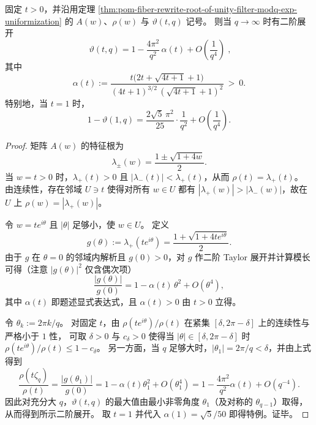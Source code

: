 \begin{theorem}\label{thm:pom-root-unity-filter-vartheta-second-order}
固定 \(t>0\)，并沿用定理 \ref{thm:pom-fiber-rewrite-root-of-unity-filter-modq-exp-uniformization} 的 \(A(w)\)、\(\rho(w)\) 与 \(\vartheta(t,q)\) 记号。
则当 \(q\to\infty\) 时有二阶展开
\[
\boxed{\;
\vartheta(t,q)
=1-\frac{4\pi^2}{q^2}\,\alpha(t)+O\!\left(\frac{1}{q^4}\right)\;},
\]
其中
\[
\alpha(t)
:=\frac{t\bigl(2t+\sqrt{4t+1}+1\bigr)}{(4t+1)^{3/2}\,(\sqrt{4t+1}+1)^2}\ >\ 0.
\]
特别地，当 \(t=1\) 时，
\[
1-\vartheta(1,q)=\frac{2\sqrt5\,\pi^2}{25}\cdot\frac{1}{q^2}+O\!\left(\frac{1}{q^4}\right).
\]
\end{theorem}
\begin{proof}
矩阵 \(A(w)\) 的特征根为
\[
\lambda_\pm(w)=\frac{1\pm\sqrt{1+4w}}{2}.
\]
当 \(w=t>0\) 时，\(\lambda_+(t)>0\) 且 \(|\lambda_-(t)|<\lambda_+(t)\)，从而 \(\rho(t)=\lambda_+(t)\)。
由连续性，存在邻域 \(U\ni t\) 使得对所有 \(w\in U\) 都有 \(|\lambda_+(w)|>|\lambda_-(w)|\)，故在 \(U\) 上
\(
\rho(w)=|\lambda_+(w)|
\)。
\par
令 \(w=t e^{i\theta}\) 且 \(|\theta|\) 足够小，使 \(w\in U\)。
定义
\[
g(\theta):=\lambda_+(t e^{i\theta})=\frac{1+\sqrt{1+4t e^{i\theta}}}{2}.
\]
由于 \(g\) 在 \(\theta=0\) 的邻域内解析且 \(g(0)>0\)，对 \(g\) 作二阶 Taylor 展开并计算模长可得（注意 \(|g(\theta)|^2\) 仅含偶次项）
\[
\frac{|g(\theta)|}{g(0)}=1-\alpha(t)\,\theta^2+O(\theta^4),
\]
其中 \(\alpha(t)\) 即题述显式表达式，且 \(\alpha(t)>0\) 由 \(t>0\) 立得。
\par
令 \(\theta_k:=2\pi k/q\)。
对固定 \(t\)，由 \(\rho(te^{i\theta})/\rho(t)\) 在紧集 \([\delta,2\pi-\delta]\) 上的连续性与严格小于 \(1\) 性，
可取 \(\delta>0\) 与 \(c_\delta>0\) 使得当 \(|\theta|\in[\delta,2\pi-\delta]\) 时
\(
\rho(te^{i\theta})/\rho(t)\le 1-c_\delta
\)。
另一方面，当 \(q\) 足够大时，\(|\theta_1|=2\pi/q<\delta\)，并由上式得到
\[
\frac{\rho(t\zeta_q)}{\rho(t)}
=\frac{|g(\theta_1)|}{g(0)}
=1-\alpha(t)\theta_1^2+O(\theta_1^4)
=1-\frac{4\pi^2}{q^2}\alpha(t)+O(q^{-4}).
\]
因此对充分大 \(q\)，\(\vartheta(t,q)\) 的最大值由最小非零角度 \(\theta_1\)（及对称的 \(\theta_{q-1}\)）取得，从而得到所示二阶展开。
取 \(t=1\) 并代入 \(\alpha(1)=\sqrt5/50\) 即得特例。证毕。
\end{proof}

